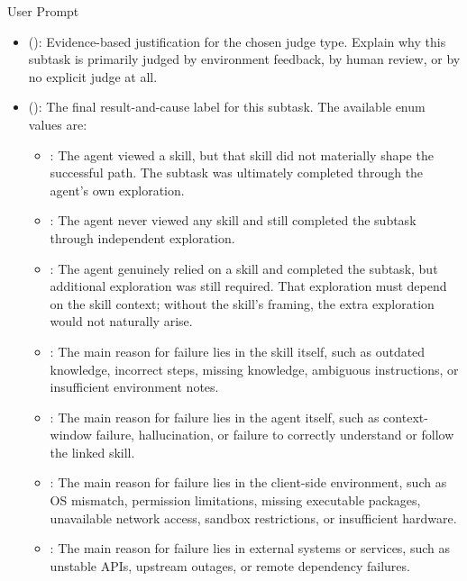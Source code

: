 \begin{svpromptbox}{User Prompt}
\begin{itemize}
\begin{itemize}
\item {}: The subtask result fundamentally depends on human preference-based review or evaluation.
\item {}: There is no explicit judge signal.
\end{itemize}
\item {} (): Evidence-based justification for the chosen judge type. Explain why this subtask is primarily judged by environment feedback, by human review, or by no explicit judge at all.
\item {} (): The final result-and-cause label for this subtask. The available enum values are:
\begin{itemize}
\item {}: The agent viewed a skill, but that skill did not materially shape the successful path. The subtask was ultimately completed through the agent's own exploration.
\item {}: The agent never viewed any skill and still completed the subtask through independent exploration.
\item {}: The agent genuinely relied on a skill and completed the subtask, but additional exploration was still required. That exploration must depend on the skill context; without the skill's framing, the extra exploration would not naturally arise.
\item {}: The main reason for failure lies in the skill itself, such as outdated knowledge, incorrect steps, missing knowledge, ambiguous instructions, or insufficient environment notes.
\item {}: The main reason for failure lies in the agent itself, such as context-window failure, hallucination, or failure to correctly understand or follow the linked skill.
\item {}: The main reason for failure lies in the client-side environment, such as OS mismatch, permission limitations, missing executable packages, unavailable network access, sandbox restrictions, or insufficient hardware.
\item {}: The main reason for failure lies in external systems or services, such as unstable APIs, upstream outages, or remote dependency failures.

\end{itemize}
\end{itemize}
\end{svpromptbox}
